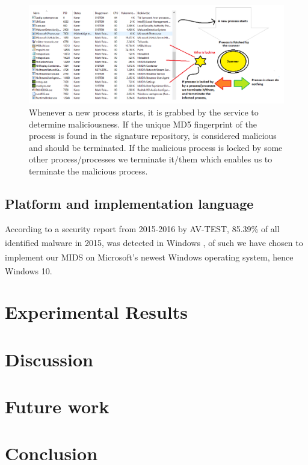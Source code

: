 \documentclass[12pt]{article} %
\begin{document}
\begin{figure}[H]
    \centering
    \includegraphics[width=1.0\textwidth]{windowsservice}
    \captionsetup{width=0.8\textwidth}
    \caption{Whenever a new process starts, it is grabbed by the service to determine maliciousness. If the unique MD5 fingerprint of the process is found in the signature repository, is considered malicious and should be terminated. If the malicious process is locked by some other process/processes we terminate it/them which enables us to terminate the malicious process.}
    \label{fig:totalmalware}
\end{figure}

\subsection{Platform and implementation language}
According to a security report from 2015-2016 by AV-TEST, 85.39\% of all identified malware in 2015, was detected in Windows\textsuperscript{\textregistered} \cite{avtestreport }, of such we have chosen to implement our MIDS on Microsoft’s newest Windows\textsuperscript{\textregistered} operating system, hence Windows \textsuperscript{\textregistered} 10.  

\section{Experimental Results}

\section{Discussion}

\section{Future work}

\section{Conclusion}
\end{document}
